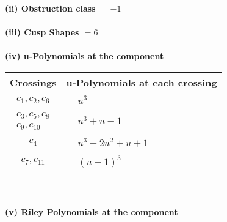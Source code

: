 \documentclass[1p]{elsarticle_modified}
\theoremstyle{definition}
\begin{document}
\flushleft \textbf{(ii) Obstruction class $= -1$}\\~\\
\flushleft \textbf{(iii) Cusp Shapes $= 6$}\\~\\
\newpage\renewcommand{\arraystretch}{1}
\flushleft \textbf{(iv) u-Polynomials at the component}\newline \\
\begin{tabular}{m{50pt}|m{274pt}}
Crossings & \hspace{64pt}u-Polynomials at each crossing \\
\hline $$\begin{aligned}c_{1},c_{2},c_{6}\end{aligned}$$&$\begin{aligned}
&u^3
\end{aligned}$\\
\hline $$\begin{aligned}c_{3},c_{5},c_{8}\\c_{9},c_{10}\end{aligned}$$&$\begin{aligned}
&u^3+u-1
\end{aligned}$\\
\hline $$\begin{aligned}c_{4}\end{aligned}$$&$\begin{aligned}
&u^3-2 u^2+u+1
\end{aligned}$\\
\hline $$\begin{aligned}c_{7},c_{11}\end{aligned}$$&$\begin{aligned}
&(u-1)^3
\end{aligned}$\\
\hline
\end{tabular}\\~\\
\newpage\renewcommand{\arraystretch}{1}
\flushleft \textbf{(v) Riley Polynomials at the component}\newline \\
\end{document}
